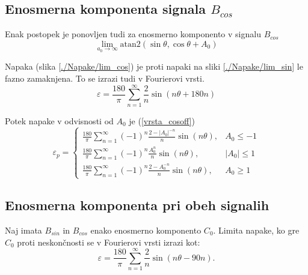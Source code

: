 \subsection{Enosmerna komponenta signala $B_{cos}$}
Enak postopek je ponovljen tudi za enosmerno komponento v signalu $B_{cos}$
\begin{equation}
\lim_{a_0 \rightarrow \infty} \mathrm{atan2}(\sin{\theta},\cos{\theta} + A_0)
\end{equation}

Napaka (slika \ref{./Napake/lim_cos}) je proti napaki na  sliki \ref{./Napake/lim_sin} le fazno zamaknjena.
To se izrazi tudi v Fourierovi vrsti.
\begin{equation}
\varepsilon = \frac{180}{\pi}\sum_{n=1}^{\infty}\frac{2}{n} \sin (n \theta +180 n)
\end{equation}

Potek napake v odvisnosti od $A_0$ je (\ref{vrsta_cosoff})
\begin{equation}
\label{vrsta_cosoff}
\varepsilon_p=
\begin{cases}
\frac{180}{\pi}\sum_{n=1}^{\infty}(-1)^n\frac{2-|A_0|^{-n}}{n} \sin (n \theta ), & A_0\leq -1 \\
\frac{180}{\pi}\sum_{n=1}^{\infty}(-1)^n\frac{A_0^n}{n} \sin (n \theta ), & |A_0|\leq 1 \\
\frac{180}{\pi}\sum_{n=1}^{\infty}(-1)^n\frac{2-A_0^{-n}}{n} \sin (n \theta ), & A_0\geq 1
\end{cases}
\end{equation}
\newpage
\subsection{Enosmerna komponenta pri obeh signalih}
\label{2_offseta}
Naj imata $B_{sin}$ in $B_{cos}$ enako enosmerno komponento $C_0$. 
Limita napake, ko gre $C_0$ proti neskončnosti se v Fourierovi vrsti izrazi kot:
\begin{equation}
\varepsilon = \frac{180}{\pi}\sum_{n=1}^{\infty}\frac{2}{n} \sin (n \theta- 90 n).
\end{equation}

